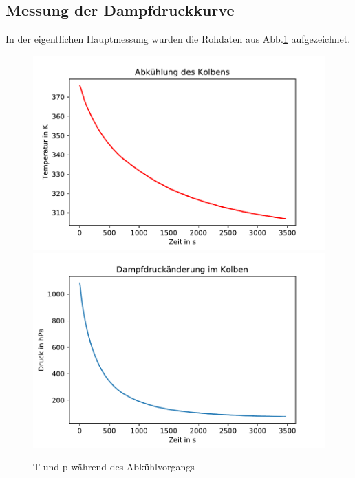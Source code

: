 \documentclass[]{article}
\begin{document}
	\subsection{Messung der Dampfdruckkurve}
	In der eigentlichen Hauptmessung wurden die Rohdaten aus Abb.\ref{DD_Roh} aufgezeichnet.\\
	\begin{figure}
		\begin{center}
			\includegraphics[scale=0.45]{Images/Dampfdruck_T.pdf}
			\includegraphics[scale=0.45]{Images/Dampfdruck_p.pdf}
			\caption{T und p während des Abkühlvorgangs}
			\label{DD_Roh}
		\end{center}
	\end{figure}
	
\end{document}
